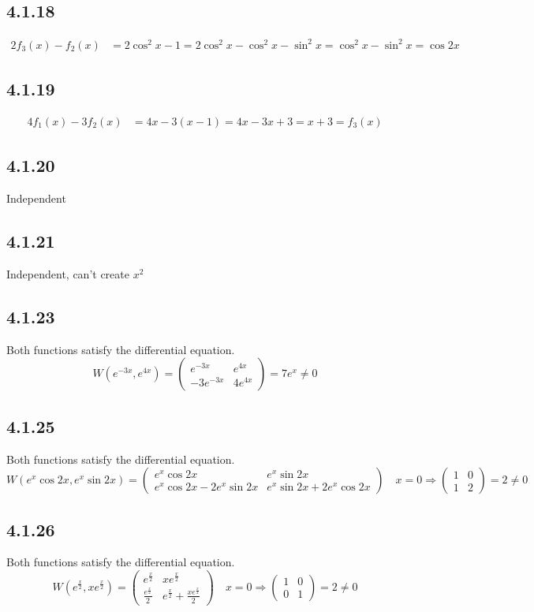 \documentclass{article}
\begin{document}
\subsection{4.1.18}
\begin{align*}
    2f_3(x)-f_2(x) &= 2\cos ^2x-1 = 2\cos ^2x-\cos ^2x-\sin ^2x = \cos ^2x-\sin ^2x = \cos 2x
\end{align*}

\subsection{4.1.19}
\begin{align*}
    4f_1(x)-3f_2(x) &= 4x-3(x-1)  = 4x-3x+3 = x+3 = f_3(x)
\end{align*}

\subsection{4.1.20}
Independent

\subsection{4.1.21}
Independent, can't create \( x^2 \)

\subsection{4.1.23}
Both functions satisfy the differential equation.
\[
    W(e^{-3x},e^{4x})= \begin{pmatrix} e^{-3x}&e^{4x}\\-3e^{-3x} & 4e^{4x}\end{pmatrix}=7e^{x}\neq0 
\]

\subsection{4.1.25}
Both functions satisfy the differential equation.
\[
    W(e^{x}\cos 2x,e^{x}\sin 2x)=\begin{pmatrix}e^{x}\cos 2x & e^{x}\sin 2x \\ e^{x}\cos 2x-2e^{x}\sin 2x & e^{x}\sin 2x+2e^{x}\cos 2x \end{pmatrix} \quad x=0 \Rightarrow \begin{pmatrix}1 & 0 \\ 1 & 2\end{pmatrix} =2 \neq 0
\]

\subsection{4.1.26}
Both functions satisfy the differential equation.
\[
    W(e^{\frac{x}{2}},xe^{\frac{x}{2}})=\begin{pmatrix} e^{\frac{x}{2}} & xe^{\frac{x}{2}}\\ \frac{e^{\frac{x}{2}}}{2} & e^{\frac{x}{2}}+\frac{xe^{\frac{x}{2}}}{2} \end{pmatrix} \quad x=0 \Rightarrow \begin{pmatrix} 1 & 0 \\ 0 & 1 \end{pmatrix} = 2 \neq 0
\]
\end{document}
